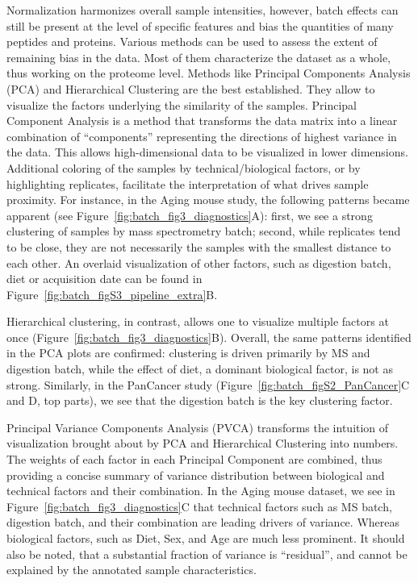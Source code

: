 \documentclass[num-refs]{wiley-article}
\begin{document}
Normalization harmonizes overall sample intensities, however, batch effects can still be present at the level of specific features and bias the quantities of many peptides and proteins.
Various methods can be used to assess the extent of remaining bias in the data. Most of them characterize the dataset as a whole, thus working on the proteome level. Methods like Principal Components Analysis (PCA) and Hierarchical Clustering are the best established. They allow to visualize the factors underlying the similarity of the samples.
Principal Component Analysis is a method that transforms the data matrix into a linear combination of “components” representing the directions of highest variance in the data. This allows high-dimensional data to be visualized in lower dimensions. Additional coloring of the samples by technical/biological factors, or by highlighting replicates, facilitate the interpretation of what drives sample proximity. For instance, in the Aging mouse study, the following patterns became apparent (see Figure~\ref{fig:batch_fig3_diagnostics}A): first, we see a strong clustering of samples by mass spectrometry batch; second, while replicates tend to be close, they are not necessarily the samples with the smallest distance to each other. An overlaid visualization of other factors, such as digestion batch, diet or acquisition date can be found in Figure~\ref{fig:batch_figS3_pipeline_extra}B. 
 
Hierarchical clustering, in contrast, allows one to visualize multiple factors at once (Figure~\ref{fig:batch_fig3_diagnostics}B). Overall, the same patterns identified in the PCA plots are confirmed: clustering is driven primarily by MS and digestion batch, while the effect of diet, a dominant biological factor, is not as strong. Similarly, in the PanCancer study (Figure~\ref{fig:batch_figS2_PanCancer}{C and D, top parts}), we see that the digestion batch is the key clustering factor.

Principal Variance Components Analysis (PVCA) transforms the intuition of visualization brought about by PCA and Hierarchical Clustering into numbers. The weights of each factor in each Principal Component are combined, thus providing a concise summary of variance distribution between biological and technical factors and their combination. In the Aging mouse dataset, we see in Figure~\ref{fig:batch_fig3_diagnostics}C that technical factors such as MS batch, digestion batch, and their combination are leading drivers of variance. Whereas biological factors, such as Diet, Sex, and Age are much less prominent. It should also be noted, that a substantial fraction of variance is “residual”, and cannot be explained by the annotated sample characteristics.
\end{document}
